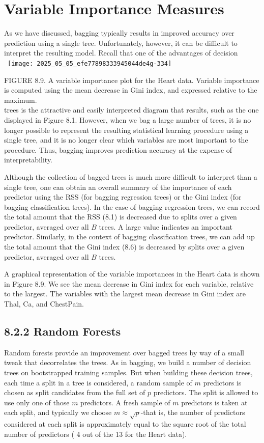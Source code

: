 \documentclass[10pt]{article}
\begin{document}
\section*{Variable Importance Measures}
As we have discussed, bagging typically results in improved accuracy over prediction using a single tree. Unfortunately, however, it can be difficult to interpret the resulting model. Recall that one of the advantages of decision\
\
\texttt{[image: 2025\_05\_05\_efe77898333945044de4g-334]}

FIGURE 8.9. A variable importance plot for the Heart data. Variable importance is computed using the mean decrease in Gini index, and expressed relative to the maximum.\\
trees is the attractive and easily interpreted diagram that results, such as the one displayed in Figure 8.1. However, when we bag a large number of trees, it is no longer possible to represent the resulting statistical learning procedure using a single tree, and it is no longer clear which variables are most important to the procedure. Thus, bagging improves prediction accuracy at the expense of interpretability.

Although the collection of bagged trees is much more difficult to interpret than a single tree, one can obtain an overall summary of the importance of each predictor using the RSS (for bagging regression trees) or the Gini index (for bagging classification trees). In the case of bagging regression trees, we can record the total amount that the RSS (8.1) is decreased due to splits over a given predictor, averaged over all $B$ trees. A large value indicates an important predictor. Similarly, in the context of bagging classification trees, we can add up the total amount that the Gini index (8.6) is decreased by splits over a given predictor, averaged over all $B$ trees.

A graphical representation of the variable importances in the Heart data is shown in Figure 8.9. We see the mean decrease in Gini index for each variable, relative to the largest. The variables with the largest mean decrease in Gini index are Thal, Ca, and ChestPain.


\subsection*{8.2.2 Random Forests}
Random forests provide an improvement over bagged trees by way of a small tweak that decorrelates the trees. As in bagging, we build a number of decision trees on bootstrapped training samples. But when building these decision trees, each time a split in a tree is considered, a random sample of $m$ predictors is chosen as split candidates from the full set of $p$ predictors. The split is allowed to use only one of those $m$ predictors. A fresh sample of $m$ predictors is taken at each split, and typically we choose $m \approx \sqrt{p}$-that is, the number of predictors considered at each split is approximately equal to the square root of the total number of predictors ( 4 out of the 13 for the Heart data).
\end{document}

